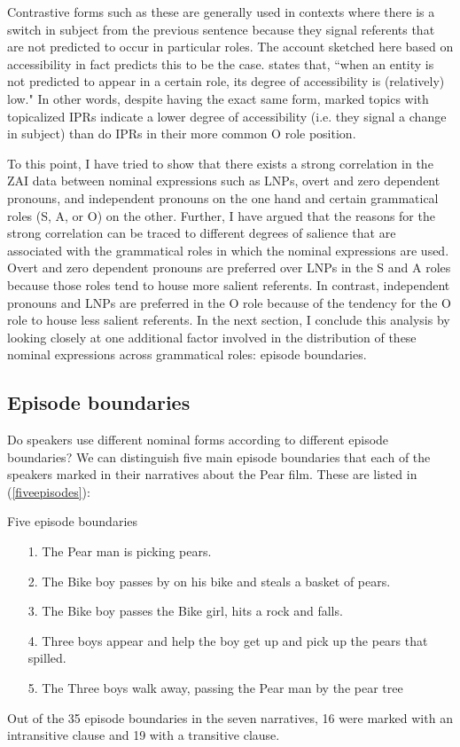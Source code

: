Contrastive forms such as these are generally used in contexts where there is a switch in subject from the previous sentence because they signal referents that are not predicted to occur in particular roles. The account sketched here based on accessibility in fact predicts this to be the case. \citet[37]{ariel2001} states that, ``when an entity is not predicted to appear in a certain role, its degree of accessibility is (relatively) low." In other words, despite having the exact same form, marked topics with topicalized IPRs indicate a lower degree of accessibility (i.e. they signal a change in subject) than do IPRs in their more common O role position. 

To this point, I have tried to show that there exists a strong correlation in the ZAI data between nominal expressions such as LNPs, overt and zero dependent pronouns, and independent pronouns on the one hand and certain grammatical roles (S, A, or O) on the other. Further, I have argued that the reasons for the strong correlation can be traced to different degrees of salience that are associated with the grammatical roles in which the nominal expressions are used. Overt and zero dependent pronouns are preferred over LNPs in the S and A roles because those roles tend to house more salient referents. In contrast, independent pronouns and LNPs are preferred in the O role because of the tendency for the O role to house less salient referents. In the next section, I conclude this analysis by looking closely at one additional factor involved in the distribution of these nominal expressions across grammatical roles: episode boundaries.


\subsection{Episode boundaries}\label{episodeboundaries}

Do speakers use different nominal forms according to different episode boundaries? We can distinguish five main episode boundaries that each of the speakers marked in their narratives about the Pear film. These are listed in (\ref{fiveepisodes}):

\ea\label{fiveepisodes} Five episode boundaries
\begin{itemize}
\item[1.] The Pear man is picking pears. 
\item[2.] The Bike boy passes by on his bike and steals a basket of pears. 
\item[3.] The Bike boy passes the Bike girl, hits a rock and falls. 
\item[4.] Three boys appear and help the boy get up and pick up the pears that spilled.
\item[5.] The Three boys walk away, passing the Pear man by the pear tree
\end{itemize}
\z
 Out of the 35 episode boundaries in the seven narratives, 16 were marked with an intransitive clause and 19 with a transitive clause.


